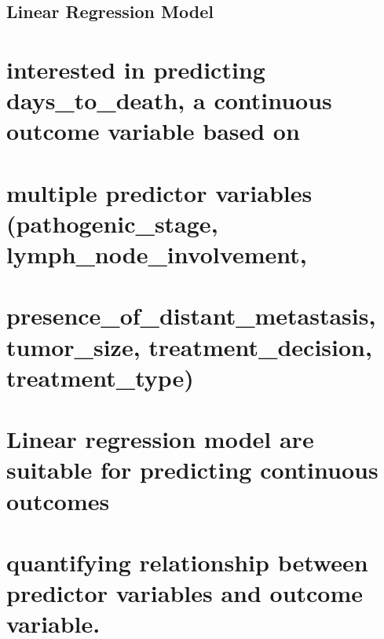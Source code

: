 \documentclass[
  letterpaper,
  DIV=11,
  numbers=noendperiod]{scrartcl}
\begin{document}
\hypertarget{linear-regression-model}{%
\subsection{Linear Regression Model}\label{linear-regression-model}}

\hypertarget{interested-in-predicting-days_to_death-a-continuous-outcome-variable-based-on}{%
\section{interested in predicting days\_to\_death, a continuous outcome
variable based
on}\label{interested-in-predicting-days_to_death-a-continuous-outcome-variable-based-on}}

\hypertarget{multiple-predictor-variables-pathogenic_stage-lymph_node_involvement}{%
\section{multiple predictor variables (pathogenic\_stage,
lymph\_node\_involvement,}\label{multiple-predictor-variables-pathogenic_stage-lymph_node_involvement}}

\hypertarget{presence_of_distant_metastasis-tumor_size-treatment_decision-treatment_type}{%
\section{presence\_of\_distant\_metastasis, tumor\_size,
treatment\_decision,
treatment\_type)}\label{presence_of_distant_metastasis-tumor_size-treatment_decision-treatment_type}}

\hypertarget{linear-regression-model-are-suitable-for-predicting-continuous-outcomes}{%
\section{Linear regression model are suitable for predicting continuous
outcomes}\label{linear-regression-model-are-suitable-for-predicting-continuous-outcomes}}

\hypertarget{quantifying-relationship-between-predictor-variables-and-outcome-variable.}{%
\section{quantifying relationship between predictor variables and
outcome
variable.}\label{quantifying-relationship-between-predictor-variables-and-outcome-variable.}}
\end{document}
